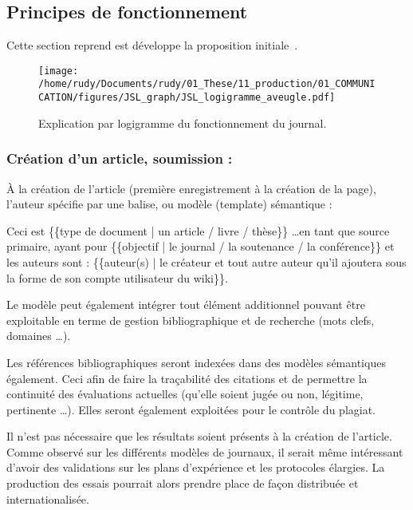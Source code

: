 \subsection{Principes de fonctionnement}
Cette section reprend est développe la proposition initiale~\cite{patard_proposal_2015}.


\begin{figure}[htbp]
\begin{center}
\texttt{[image: /home/rudy/Documents/rudy/01\_These/11\_production/01\_COMMUNICATION/figures/JSL\_graph/JSL\_logigramme\_aveugle.pdf]}
\caption{Explication par logigramme du fonctionnement du journal.}
\label{fig:JSL_logigramme}
\end{center}
\end{figure}


\subsubsection{Création d'un article, soumission :}
À la création de l'article (première enregistrement à la création de la page), l'auteur spécifie par une balise, ou modèle (template) sémantique :

Ceci est \{\{type de document | un article / livre / thèse\}\} \ldots en tant que source primaire,
ayant pour \{\{objectif | le journal / la soutenance / la conférence\}\} et les auteurs sont : \{\{auteur(s) | le créateur et tout autre auteur qu'il ajoutera sous la forme de son compte utilisateur du wiki\}\}.

Le modèle peut également intégrer tout élément additionnel pouvant être exploitable en terme de gestion bibliographique et de recherche (mots clefs, domaines \ldots).

Les références bibliographiques seront indexées dans des modèles sémantiques également.
Ceci afin de faire la traçabilité des citations et de permettre la continuité des évaluations actuelles (qu'elle soient jugée ou non, légitime, pertinente \ldots).
Elles seront également exploitées pour le contrôle du plagiat.

Il n'est pas nécessaire que les résultats soient présents à la création de l'article.
Comme observé sur les différents modèles de journaux, il serait même intéressant d'avoir des validations sur les plans d'expérience et les protocoles élargies.
La production des essais pourrait alors prendre place de façon distribuée et internationalisée.

